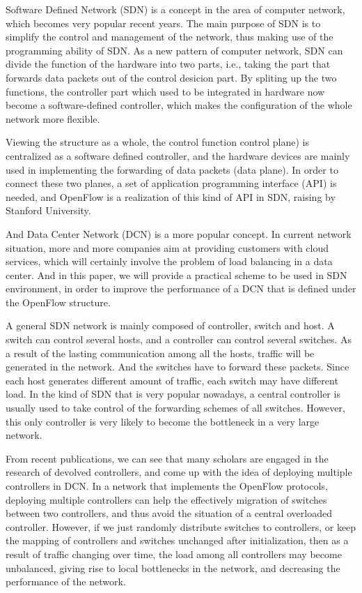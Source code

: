 \begin{englishabstract}

Software Defined Network (SDN) is a concept in the area of computer network, which becomes very popular recent years. The main purpose of SDN is to simplify the control and management of the network, thus making use of the programming ability of SDN. As a new pattern of computer network, SDN can divide the function of the hardware into two parts, i.e., taking the part that forwards data packets out of the control desicion part. By spliting up the two functions, the controller part which used to be integrated in hardware now become a software-defined controller, which makes the configuration of the whole network more flexible.

Viewing the structure as a whole, the control function control plane) is centralized as a software defined controller, and the hardware devices are mainly used in implementing the forwarding of data packets (data plane). In order to connect these two planes, a set of application programming interface (API) is needed, and OpenFlow is a realization of this kind of API in SDN, raising by Stanford University.

And Data Center Network (DCN) is a more popular concept. In current network situation, more and more companies aim at providing customers with cloud services, which will certainly involve the problem of load balancing in a data center. And in this paper, we will provide a practical scheme to be used in SDN environment, in order to improve the performance of a DCN that is defined under the OpenFlow structure.

A general SDN network is mainly composed of controller, switch and host. A switch can control several hosts, and a controller can control several switches. As a result of the lasting communication among all the hosts, traffic will be generated in the network. And the switches have to forward these packets. Since each host generates different amount of traffic, each switch may have different load. In the kind of SDN that is very popular nowadays, a central controller is usually used to take control of the forwarding schemes of all switches. However, this only controller is very likely to become the bottleneck in a very large network.

From recent publications, we can see that many scholars are engaged in the research of devolved controllers, and come up with the idea of deploying multiple controllers in DCN. In a network that implements the OpenFlow protocols, deploying multiple controllers can help the effectively migration of switches between two controllers, and thus avoid the situation of a central overloaded controller. However, if we just randomly distribute switches to controllers, or keep the mapping of controllers and switches unchanged after initialization, then as a result of traffic changing over time, the load among all controllers may become unbalanced, giving rise to local bottlenecks in the network, and decreasing the performance of the network.


\end{englishabstract}
